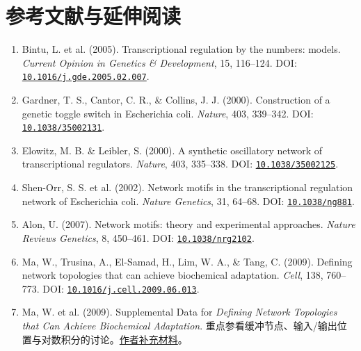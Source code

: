 \documentclass[11pt,a4paper,UTF8,fontset=fandol]{ctexart}
\begin{document}
\clearpage\section*{参考文献与延伸阅读}
\begin{enumerate}[leftmargin=*,itemsep=2pt,parsep=0pt]\small
\item Bintu, L. et al. (2005). Transcriptional regulation by the numbers: models. \emph{Current Opinion in Genetics \& Development}, 15, 116--124. DOI: \href{https://doi.org/10.1016/j.gde.2005.02.007}{\nolinkurl{10.1016/j.gde.2005.02.007}}.
\item Gardner, T. S., Cantor, C. R., \& Collins, J. J. (2000). Construction of a genetic toggle switch in Escherichia coli. \emph{Nature}, 403, 339--342. DOI: \href{https://doi.org/10.1038/35002131}{\nolinkurl{10.1038/35002131}}.
\item Elowitz, M. B. \& Leibler, S. (2000). A synthetic oscillatory network of transcriptional regulators. \emph{Nature}, 403, 335--338. DOI: \href{https://doi.org/10.1038/35002125}{\nolinkurl{10.1038/35002125}}.
\item Shen-Orr, S. S. et al. (2002). Network motifs in the transcriptional regulation network of Escherichia coli. \emph{Nature Genetics}, 31, 64--68. DOI: \href{https://doi.org/10.1038/ng881}{\nolinkurl{10.1038/ng881}}.
\item Alon, U. (2007). Network motifs: theory and experimental approaches. \emph{Nature Reviews Genetics}, 8, 450--461. DOI: \href{https://doi.org/10.1038/nrg2102}{\nolinkurl{10.1038/nrg2102}}.
\item Ma, W., Trusina, A., El-Samad, H., Lim, W. A., \& Tang, C. (2009). Defining network topologies that can achieve biochemical adaptation. \emph{Cell}, 138, 760--773. DOI: \href{https://doi.org/10.1016/j.cell.2009.06.013}{\nolinkurl{10.1016/j.cell.2009.06.013}}.
\item Ma, W. et al. (2009). Supplemental Data for \emph{Defining Network Topologies that Can Achieve Biochemical Adaptation}. 重点参看缓冲节点、输入/输出位置与对数积分的讨论。\href{https://ucsf-cmp.github.io/lim-lab/papers/pdfs/wm_2009_supp.pdf}{作者补充材料}。
\end{enumerate}
\end{document}
